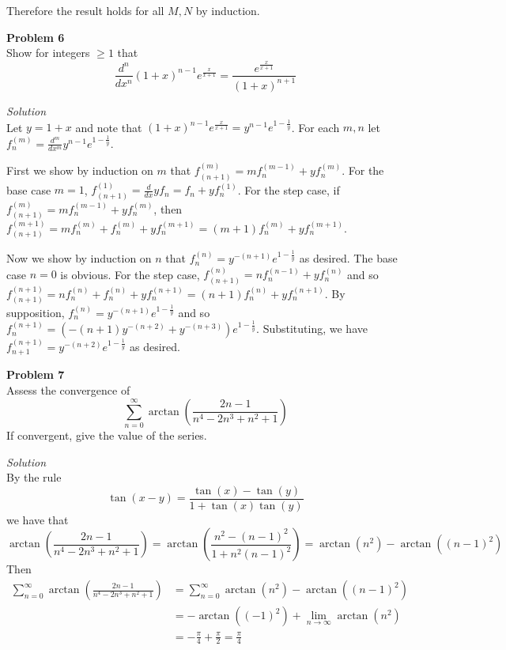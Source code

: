 \documentclass{amsart}
\begin{document}
Therefore the result holds for all $M, N$ by induction.

\pagebreak

\textbf{Problem 6}\\
Show for integers $\geq 1$ that
\[ \frac{d^n}{dx^n} (1 + x)^{n - 1} e^\frac{x}{x + 1} = \frac{e^\frac{x}{x + 1}}{(1 + x)^{n + 1}} \]

\textit{Solution}\\
Let $y = 1 + x$ and note that $\displaystyle (1 + x)^{n - 1} e^\frac{x}{x + 1} = y^{n - 1} e^{1 - \frac{1}{y}}$.
For each $m, n$ let $\displaystyle f_n^{(m)} = \frac{d^m}{dx^m} y^{n - 1} e^{1 - \frac{1}{y}}$.

First we show by induction on $m$ that $f_{(n + 1)}^{(m)} = mf_n^{(m - 1)} + yf_n^{(m)}$.
For the base case $m = 1$, $\displaystyle f_{(n + 1)}^{(1)} = \frac{d}{dx} yf_n = f_n + yf_n^{(1)}$.
For the step case, if $f_{(n + 1)}^{(m)} = mf_n^{(m - 1)} + yf_n^{(m)}$, then $f_{(n + 1)}^{(m + 1)} = mf_n^{(m)} + f_n^{(m)} + yf_n^{(m + 1)} = (m + 1)f_n^{(m)} + yf_n^{(m + 1)}$.

Now we show by induction on $n$ that $f_n^{(n)} = y^{-(n + 1)} e^{1 - \frac{1}{y}}$ as desired.
The base case $n = 0$ is obvious.
For the step case, $f_{(n + 1)}^{(n)} = nf_n^{(n - 1)} + yf_n^{(n)}$ and so $f_{(n + 1)}^{(n + 1)} = nf_n^{(n)} + f_n^{(n)} + yf_n^{(n + 1)} = (n + 1)f_n^{(n)} + yf_n^{(n + 1)}$.
By supposition, $f_n^{(n)} = y^{-(n + 1)} e^{1 - \frac{1}{y}}$ and so $f_n^{(n + 1)} = (-(n + 1)y^{-(n + 2)} + y^{-(n + 3)}) e^{1 - \frac{1}{y}}$.
Substituting, we have $f_{n + 1}^{(n + 1)} = y^{-(n + 2)} e^{1 - \frac{1}{y}}$ as desired.

\pagebreak

\textbf{Problem 7}\\
Assess the convergence of
\[ \sum_{n = 0}^\infty \arctan\left(\frac{2n - 1}{n^4 - 2n^3 + n^2 + 1}\right) \]
If convergent, give the value of the series.

\textit{Solution}\\
By the rule
\[ \displaystyle \tan(x - y) = \frac{\tan(x) - \tan(y)}{1 + \tan(x)\tan(y)} \]
we have that
\[ \displaystyle \arctan\left(\frac{2n - 1}{n^4 - 2n^3 + n^2 + 1}\right) = \arctan\left(\frac{n^2 - (n - 1)^2}{1 + n^2(n - 1)^2}\right) = \arctan(n^2) - \arctan((n - 1)^2) \]
Then
\begin{align*} \sum_{n = 0}^\infty \arctan\left(\frac{2n - 1}{n^4 - 2n^3 + n^2 + 1}\right) &= \sum_{n = 0}^\infty \arctan(n^2) - \arctan((n - 1)^2) \\
&= -\arctan((-1)^2) + \lim_{n \to \infty} \arctan(n^2) \\
&= -\frac{\pi}{4} + \frac{\pi}{2} = \frac{\pi}{4}
\end{align*}
\end{document}
